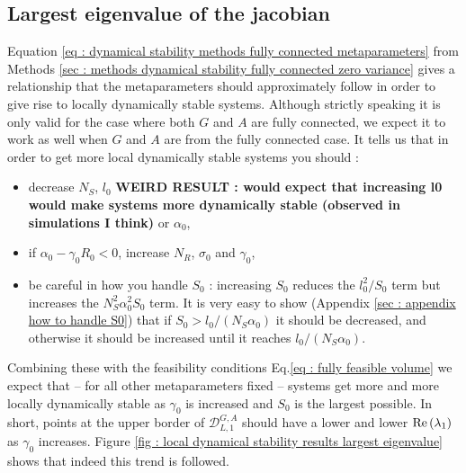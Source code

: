 \documentclass[12pt, titlepage]{report}
\begin{document}
\subsection{Largest eigenvalue of the jacobian}
Equation \ref{eq : dynamical stability methods fully connected metaparameters} from Methods \ref{sec : methods dynamical stability fully connected zero variance} gives a relationship that the metaparameters should approximately follow in order to give rise to locally dynamically stable systems. Although strictly speaking it is only valid for the case where both $G$ and $A$ are fully connected, we expect it to work as well when $G$ and $A$ are  from the fully connected case. It tells us that in order to get more local dynamically stable systems you should :
\begin{itemize}
  \item decrease $N_S$, $l_0$ \textbf{WEIRD RESULT : would expect that increasing l0 would make systems more dynamically stable (observed in simulations I think)} or $\alpha_0$,
  \item if $\alpha_0 - \gamma_0 R_0 < 0$, increase $N _R$, $\sigma_0$ and $\gamma_0$,
  \item be careful in how you handle $S_0$ : increasing $S_0$ reduces the $l_0^2/S_0$ term but increases the $N_S^2 \alpha_0^2 S_0$ term. It is very easy to show (Appendix \ref{sec : appendix how to handle S0}) that if $S_0 > l_0/(N_S \alpha_0)$ it should be decreased, and otherwise it should be increased until it reaches $l_0/(N_S \alpha_0)$.
\end{itemize}
Combining these with the feasibility conditions Eq.\eqref{eq : fully feasible volume} we expect that -- for all other metaparameters fixed -- systems get more and more locally dynamically stable as $\gamma_0$ is increased and $S_0$ is the largest possible. In short, points at the upper border of $\mathcal{D}^{G,A}_{L,1}$ should have a lower and lower $\text{Re}\left(\lambda_1\right)$ as $\gamma_0$ increases. Figure \ref{fig : local dynamical stability results largest eigenvalue} shows that indeed this trend is followed.
\end{document}
